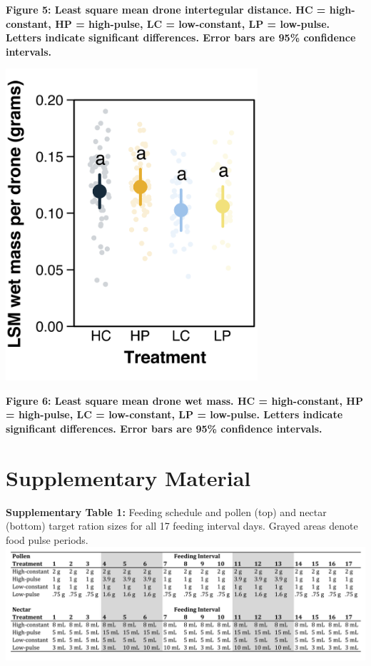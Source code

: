 \documentclass[11pt,]{article}
\begin{document}
\textbf{Figure 5: Least square mean drone intertegular distance. HC =
high-constant, HP = high-pulse, LC = low-constant, LP = low-pulse.
Letters indicate significant differences. Error bars are 95\% confidence
intervals.} \clearpage

\newpage

\includegraphics[width=0.7\textwidth,height=\textheight]{./ms_figs/fig6_mcdronemass_v2.png}

\textbf{Figure 6: Least square mean drone wet mass. HC = high-constant,
HP = high-pulse, LC = low-constant, LP = low-pulse. Letters indicate
significant differences. Error bars are 95\% confidence intervals.}
\clearpage

\newpage

\hypertarget{supplementary-material}{%
\section{Supplementary Material}\label{supplementary-material}}

\textbf{Supplementary Table 1:} Feeding schedule and pollen (top) and
nectar (bottom) target ration sizes for all 17 feeding interval days.
Grayed areas denote food pulse periods.
\includegraphics[width=1\textwidth,height=\textheight]{./ms_figs/ch2_suptab1.png}
\clearpage \newpage
\end{document}
